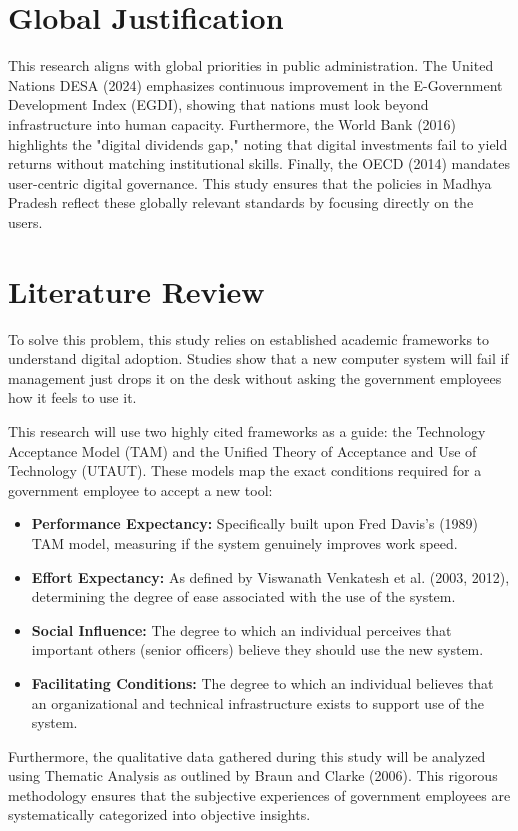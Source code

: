 \documentclass[11pt,a4paper]{article}
\begin{document}
\section{Global Justification}

\vspace{0.2cm}
This research aligns with global priorities in public administration. The United Nations DESA (2024) emphasizes continuous improvement in the E-Government Development Index (EGDI), showing that nations must look beyond infrastructure into human capacity. Furthermore, the World Bank (2016) highlights the "digital dividends gap," noting that digital investments fail to yield returns without matching institutional skills. Finally, the OECD (2014) mandates user-centric digital governance. This study ensures that the policies in Madhya Pradesh reflect these globally relevant standards by focusing directly on the users.

\section{Literature Review}

\vspace{0.2cm}
To solve this problem, this study relies on established academic frameworks to understand digital adoption. Studies show that a new computer system will fail if management just drops it on the desk without asking the government employees how it feels to use it. 

This research will use two highly cited frameworks as a guide: the Technology Acceptance Model (TAM) and the Unified Theory of Acceptance and Use of Technology (UTAUT). These models map the exact conditions required for a government employee to accept a new tool:
\begin{itemize}
  \item \textbf{Performance Expectancy:} Specifically built upon Fred Davis's (1989) TAM model, measuring if the system genuinely improves work speed.
  \item \textbf{Effort Expectancy:} As defined by Viswanath Venkatesh et al. (2003, 2012), determining the degree of ease associated with the use of the system.
  \item \textbf{Social Influence:} The degree to which an individual perceives that important others (senior officers) believe they should use the new system.
  \item \textbf{Facilitating Conditions:} The degree to which an individual believes that an organizational and technical infrastructure exists to support use of the system.
\end{itemize}
Furthermore, the qualitative data gathered during this study will be analyzed using Thematic Analysis as outlined by Braun and Clarke (2006). This rigorous methodology ensures that the subjective experiences of government employees are systematically categorized into objective insights.
\end{document}
